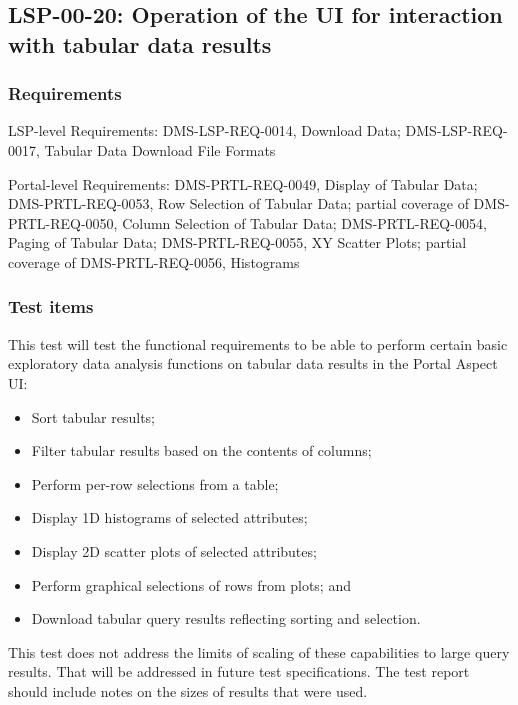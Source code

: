 \subsection{LSP-00-20: Operation of the UI for interaction with tabular data results}
\label{lsp-00-20}

\subsubsection{Requirements}

LSP-level Requirements: DMS-LSP-REQ-0014, Download Data; DMS-LSP-REQ-0017, Tabular Data Download File Formats

Portal-level Requirements: DMS-PRTL-REQ-0049, Display of Tabular Data; DMS-PRTL-REQ-0053, Row Selection of Tabular Data; partial coverage of DMS-PRTL-REQ-0050, Column Selection of Tabular Data; DMS-PRTL-REQ-0054, Paging of Tabular Data; DMS-PRTL-REQ-0055, XY Scatter Plots; partial coverage of DMS-PRTL-REQ-0056, Histograms

\subsubsection{Test items}

This test will test the functional requirements to be able to perform certain basic exploratory data analysis functions on tabular data results in the Portal Aspect UI:

\begin{itemize}

  \item{Sort tabular results;}
  \item{Filter tabular results based on the contents of columns;}
  \item{Perform per-row selections from a table;}
  \item{Display 1D histograms of selected attributes;}
  \item{Display 2D scatter plots of selected attributes;}
  \item{Perform graphical selections of rows from plots; and}
  \item{Download tabular query results reflecting sorting and selection.}

\end{itemize}

This test does not address the limits of scaling of these capabilities to large query results.
That will be addressed in future test specifications.
The test report should include notes on the sizes of results that were used.

